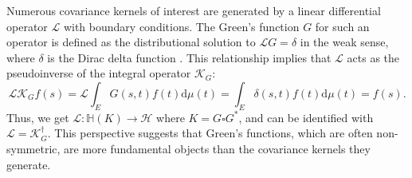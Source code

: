 \documentclass[noinfoline]{imsart}\setcounter{tocdepth}{2}
\renewcommand{\b}[1]{\mathbb{#1}} %
\newcommand{\s}[1]{\mathscr{#1}} %
\renewcommand{\c}[1]{\mathcal{#1}} %
\newcommand{\rd}{\mathrm{d}} %
\theoremstyle{plain}
\begin{document}
Numerous covariance kernels of interest are generated by a linear differential operator $\s{L}$ with boundary conditions. The Green's function $G$ for such an operator is defined as the distributional solution to $\s{L} G = \delta$ in the weak sense, where $\delta$ is the Dirac delta function \cite{hall2013quantum, conway2019course}. This relationship implies that $\s{L}$ acts as the pseudoinverse of the integral operator $\s{K}_{G}$:
\begin{equation*}
    \s{L} \s{K}_{G} f(s) = \s{L} \int_{E} G(s, t) f(t) \rd \mu(t) = \int_{E} \delta(s, t) f(t) \rd \mu(t) = f(s).
\end{equation*}
Thus, we get $\s{L}: \b{H}(K) \rightarrow \c{H}$ where $K = G \square G^{*}$, and can be identified with $\s{L} = \s{K}_{G}^{\dagger}$. This perspective suggests that Green's functions, which are often non-symmetric, are more fundamental objects than the covariance kernels they generate.
\end{document}
